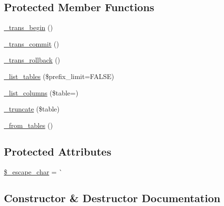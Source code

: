 \subsection*{Protected Member Functions}
\begin{DoxyCompactItemize}
\item 
\mbox{\hyperlink{class_c_i___d_b__pdo__mysql__driver_ac81ac882c1d54347d810199a15856aac}{\+\_\+trans\+\_\+begin}} ()
\item 
\mbox{\hyperlink{class_c_i___d_b__pdo__mysql__driver_a6fe7f373e0b11cfae23a5f41c0b35dda}{\+\_\+trans\+\_\+commit}} ()
\item 
\mbox{\hyperlink{class_c_i___d_b__pdo__mysql__driver_ad49a116b0776c26b53114c9093fd102a}{\+\_\+trans\+\_\+rollback}} ()
\item 
\mbox{\hyperlink{class_c_i___d_b__pdo__mysql__driver_a435c0f3ce54fe7daa178baa8532ebd54}{\+\_\+list\+\_\+tables}} (\$prefix\+\_\+limit=F\+A\+L\+SE)
\item 
\mbox{\hyperlink{class_c_i___d_b__pdo__mysql__driver_a7ccb7f9c301fe7f0a9db701254142b63}{\+\_\+list\+\_\+columns}} (\$table=\textquotesingle{}\textquotesingle{})
\item 
\mbox{\hyperlink{class_c_i___d_b__pdo__mysql__driver_aa029600528fc1ce660a23ff4b4667f95}{\+\_\+truncate}} (\$table)
\item 
\mbox{\hyperlink{class_c_i___d_b__pdo__mysql__driver_aef43f7e3e7b71d337ff3724c5eb14f10}{\+\_\+from\+\_\+tables}} ()
\end{DoxyCompactItemize}
\subsection*{Protected Attributes}
\begin{DoxyCompactItemize}
\item 
\mbox{\hyperlink{class_c_i___d_b__pdo__mysql__driver_aaec2fb0112850159063a8e47ad3aed6e}{\$\+\_\+escape\+\_\+char}} = \textquotesingle{}\`{}\textquotesingle{}
\end{DoxyCompactItemize}


\subsection{Constructor \& Destructor Documentation}
\mbox{\label{class_c_i___d_b__pdo__mysql__driver_a9162320adff1a1a4afd7f2372f753a3e}} 
